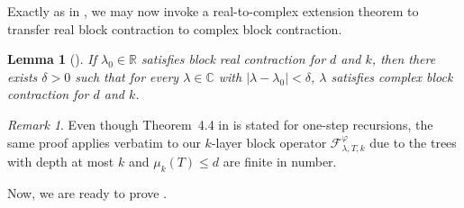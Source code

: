 \documentclass[a4paper,11pt]{article}
\theoremstyle{plain}
\newtheorem{lemma}[theorem]{Lemma}
\theoremstyle{definition}
\theoremstyle{remark}
\newtheorem{remark}[theorem]{Remark}
\newcommand{\1}{\mathbf{1}}
\newcommand{\R}{\mathbb{R}}
\newcommand{\C}{\mathbb{C}}
\begin{document}
Exactly as in \cite{shao2021contraction}, we may now invoke a real-to-complex extension theorem to transfer
real block contraction to complex block contraction.

\begin{lemma}[{\cite[Theorem~4.4]{shao2021contraction}}]
\label{lem:real_to_complex_extension}
If $\lambda_0\in\R$ satisfies block real contraction for $d$ and $k$, then there exists $\delta>0$ such that for
every $\lambda\in\C$ with $|\lambda-\lambda_0|<\delta$,     $\lambda$ satisfies complex block contraction for $d$ and $k$.
\end{lemma}

\begin{remark}
    Even though Theorem~4.4 in \cite{shao2021contraction} is stated for one-step recursions, the same proof applies verbatim to our $k$-layer block operator $\mathcal{F}^{\varphi}_{\lambda,T,k}$ due to the trees with depth at most $k$ and
    $\mu_k(T)\le d$ are finite in number.
\end{remark}

Now, we are ready to prove .

    
\end{document}
